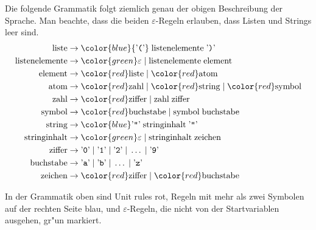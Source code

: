 \begin{loesung}
\begin{teilaufgaben}
\item Die folgende Grammatik folgt ziemlich genau der obigen Beschreibung
der Sprache. Man beachte, dass die beiden $\varepsilon$-Regeln
erlauben, dass Listen und Strings leer sind.
\begin{align*}
\text{liste}&\rightarrow {\color{blue}
{\text{'{\tt (}'}}\;
\text{listenelemente}\;
{\text{'{\tt )}'}}}
\\
\text{listenelemente}&\rightarrow {\color{green}\varepsilon} \;|\; \text{listenelemente}\;\text{element}
\\
\text{element}&\rightarrow {\color{red}\text{liste}} \;|\; {\color{red}\text{atom}}
\\
\text{atom}&\rightarrow {\color{red}\text{zahl}}\;|\;{\color{red}\text{string}}\;|\;{\color{red}\text{symbol}}
\\
\text{zahl}&\rightarrow {\color{red}\text{ziffer}}\;|\;\text{zahl}\;\text{ziffer}
\\
\text{symbol}&\rightarrow {\color{red}\text{buchstabe}} \;|\; \text{symbol}\;\text{buchstabe}
\\
\text{string}&\rightarrow {\color{blue}
\text{'{\tt\textquotedblright}'}\; \text{stringinhalt}\;
\text{'{\tt\textquotedblright}'}}
\\
\text{stringinhalt}&\rightarrow {\color{green}\varepsilon} \;|\; \text{stringinhalt}\;\text{zeichen}
\\
\text{ziffer}&\rightarrow
{\text{'{\tt 0}'}} \;|\;
{\text{'{\tt 1}'}} \;|\;
{\text{'{\tt 2}'}} \;|\;
\dots \;|\;
{\text{'{\tt 9}'}}
\\
\text{buchstabe}&\rightarrow
{\text{'{\tt a}'}} \;|\;
{\text{'{\tt b}'}} \;|\;
\dots \;|\;
{\text{'{\tt z}'}}
\\
\text{zeichen}&\rightarrow {\color{red}\text{ziffer}}\; |\; {\color{red}\text{buchstabe}}
\end{align*}
\item
In der Grammatik oben sind
Unit rules
{\color{red}
rot},
Regeln mit mehr als zwei Symbolen auf der rechten Seite
{\color{blue}
blau},
und
$\varepsilon$-Regeln, die nicht von der Startvariablen ausgehen,
{\color{green}
gr"un} markiert.
\qedhere
\end{teilaufgaben}
\end{loesung}

